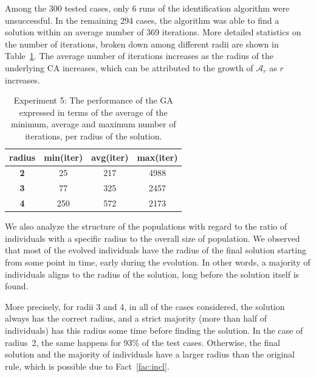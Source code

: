 Among the 300 tested cases, only 6 runs of the identification algorithm were unsuccessful. In the remaining 294 cases, the algorithm was able to find a solution within an average number of 369 iterations. More detailed statistics on the number of iterations, broken down among different radii are shown in Table~\ref{tab:exp4-iter-st}. The average number of iterations increases as the radius of the underlying CA increases, which can be attributed to the growth of $\mathcal{A}_r$ as $r$ increases.
\begin{table}[ht]
	\centering
	\caption{Experiment 5: The performance of the GA expressed in terms of the average of the minimum, average and maximum number of iterations, per radius of the solution.}\label{tab:exp4-iter-st}
	\begin{tabular}{c|c|c|c}
		{\bf radius} & {\bf min(iter)} & {\bf avg(iter)} & {\bf max(iter)} \\\hline
		{\bf 2}      & 25              & 217             & 4988            \\
		{\bf 3}      & 77              & 325             & 2457            \\
		{\bf 4}      & 250             & 572             & 2173
	\end{tabular}
\end{table}

We also analyze the structure of the populations with regard to the ratio of individuals with a specific radius to the overall size of population. We observed that most of the evolved individuals have the radius of the final solution starting from some point in time, early during the evolution. In other words, a majority of individuals aligns to the radius of the solution, long before the solution itself is found.

More precisely, for radii 3 and 4, in all of the cases considered, the solution always has the correct radius, and a strict majority (more than half of individuals) has this radius some time before finding the solution. In the case of radius~2, the same happens for 93\% of the test cases. Otherwise, the final solution and the majority of individuals have a larger radius than the original rule, which is possible due to Fact~\ref{fac:incl}.

